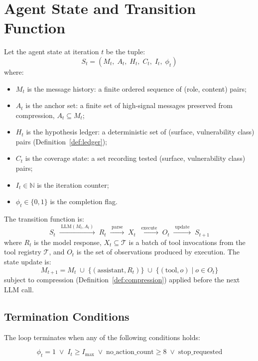 \documentclass[12pt, a4paper, oneside, openany]{book}
\begin{document}
\section{Agent State and Transition Function}
\label{sec:formal_state}

Let the agent state at iteration $t$ be the tuple:
\[
  S_t = (M_t,\; A_t,\; H_t,\; C_t,\; I_t,\; \phi_t)
\]
where:
\begin{itemize}[leftmargin=*]
  \item $M_t$ is the message history: a finite ordered sequence of
    (role, content) pairs;
  \item $A_t$ is the anchor set: a finite set of high-signal
    messages preserved from compression, $A_t \subseteq M_t$;
  \item $H_t$ is the hypothesis ledger: a deterministic set of
    (surface, vulnerability class) pairs (Definition~\ref{def:ledger});
  \item $C_t$ is the coverage state: a set recording tested
    (surface, vulnerability class) pairs;
  \item $I_t \in \mathbb{N}$ is the iteration counter;
  \item $\phi_t \in \{0, 1\}$ is the completion flag.
\end{itemize}

The transition function is:
\[
  S_t \;\xrightarrow{\;\text{LLM}(M_t, A_t)\;}\; R_t
  \;\xrightarrow{\;\text{parse}\;}\; X_t
  \;\xrightarrow{\;\text{execute}\;}\; O_t
  \;\xrightarrow{\;\text{update}\;}\; S_{t+1}
\]
where $R_t$ is the model response, $X_t \subseteq \mathcal{T}$ is a
batch of tool invocations from the tool registry $\mathcal{T}$, and
$O_t$ is the set of observations produced by execution.  The state
update is:
\[
  M_{t+1} = M_t \;\cup\; \{(\text{assistant}, R_t)\} \;\cup\;
             \{(\text{tool}, o) \mid o \in O_t\}
\]
subject to compression (Definition~\ref{def:compression}) applied
before the next LLM call.

\subsection*{Termination Conditions}

The loop terminates when any of the following conditions holds:

\begin{equation}
  \phi_t = 1 \;\lor\; I_t \geq I_{\max} \;\lor\;
  \text{no\_action\_count} \geq 8 \;\lor\; \text{stop\_requested}
  \label{eq:termination}
\end{equation}
\end{document}
